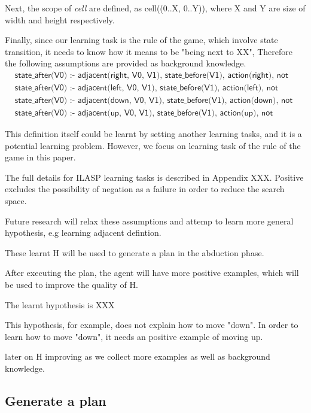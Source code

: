 Next, the scope of \textit{cell} are defined, as cell((0..X, 0..Y)), where X and Y are size of width and height respectively.

Finally, since our learning task is the rule of the game, which involve state transition, it needs to know how it means to be "being next to XX",
Therefore the following assumptions are provided as background knowledge. 
\begin{equation}
\begin{split}
&\textsf{state\_after(V0) :- adjacent(right, V0, V1), state\_before(V1), action(right), not wall(V0).}\\
&\textsf{state\_after(V0) :- adjacent(left, V0, V1), state\_before(V1), action(left), not wall(V0).}\\
&\textsf{state\_after(V0) :- adjacent(down, V0, V1), state\_before(V1), action(down), not wall(V0).}\\
&\textsf{state\_after(V0) :- adjacent(up, V0, V1), state\_before(V1), action(up), not wall(V0).}
\end{split}
\end{equation}

This definition itself could be learnt by setting another learning tasks, and it is a potential learning problem. 
However, we focus on learning task of the rule of the game in this paper. 

The full details for ILASP learning tasks is described in Appendix XXX.
Positive excludes the possibility of negation as a failure in order to reduce the search space.

Future research will relax these assumptions and attemp to learn more general hypothesis, 
e.g learning adjacent defintion. 

These learnt H will be used to generate a plan in the abduction phase. 

After executing the plan, the agent will have more positive examples, which will be used to improve the quality of H. 

The learnt hypothesis is XXX

This hypothesis, for example, does not explain how to move "down". In order to learn how to move "down", it needs an positive example of moving up. 

later on H improving as we collect more examples as well as background knowledge.

\subsection{Generate a plan}
\label{Generate a plan}

